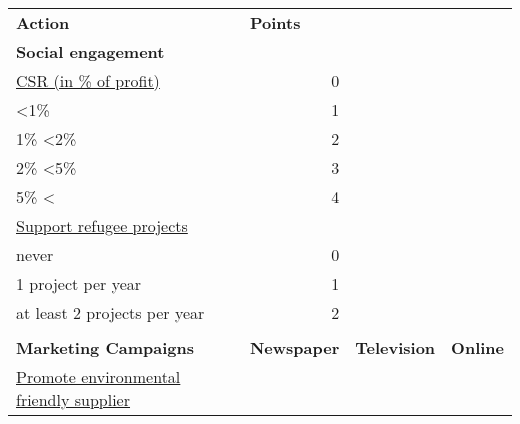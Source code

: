 \begin{table}[]
\begin{tabular}{|l|r|r|r|}
\hline
\multicolumn{1}{|l|}{\textbf{Action}}             & \multicolumn{1}{l|}{\textbf{Points}} & \multicolumn{1}{l|}{}       & \multicolumn{1}{l|}{}   \\
\textbf{Social engagement}                         &                                     &                            &                        \\
\underline{CSR (in \% of profit)}                           & 0                                   &                            &                        \\
\textless 1\%                                   & 1                                   &                            &                        \\
1\% \textless 2\%                               & 2                                   &                            &                        \\
2\% \textless 5\%                               & 3                                   &                            &                        \\
5\% \textless{}                                 & 4                                   &                            &                        \\
\underline{Support refugee projects}                  &                                     &                            &                        \\
never                                           & 0                                   &                            &                        \\
1 project per year                              & 1                                   &                            &                        \\
at least 2 projects per year                    & 2                                   &                            &                        \\
                                                &                                     &                            &                        \\
\textbf{Marketing Campaigns}                    & \textbf{Newspaper}           & \textbf{Television} & \textbf{Online} \\
\underline{Promote environmental friendly supplier}   &                                     &                            &                        \\

\end{tabular}
\end{table}
